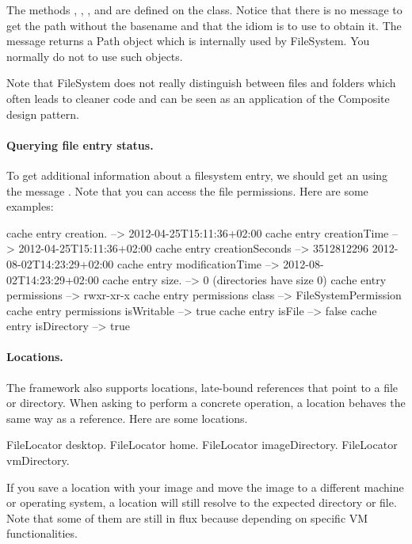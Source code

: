\documentclass[a4paper,10pt,twoside]{book}
\begin{document}
The methods , , , and   are defined on the  class. Notice that there is no message to get 
the path without the basename and that the idiom is to use  to obtain it.
The message  returns a Path object which is internally used by FileSystem. You normally do not to use such objects. 
  
Note that FileSystem does not really distinguish between files and folders which often leads to cleaner code and can be seen as an application of the Composite design pattern.   
  
\paragraph{Querying file entry status.}
To get additional information about a filesystem entry, we should get an  using the message . Note that you can access the file permissions. Here are some examples:

\begin{code}{}
cache entry creation.		-->  2012-04-25T15:11:36+02:00
cache entry creationTime -->  2012-04-25T15:11:36+02:00
cache entry creationSeconds -->  3512812296 2012-08-02T14:23:29+02:00
cache entry modificationTime -->  2012-08-02T14:23:29+02:00
cache entry size.			--> 0 (directories have size 0)
cache entry permissions		-->  rwxr-xr-x
cache entry permissions class		-->  FileSystemPermission
cache entry permissions isWritable --> true
cache entry isFile			--> false
cache entry isDirectory 		--> true
\end{code} 


\paragraph{Locations.}
The framework also supports locations, late-bound references that point to a file or directory. When asking to perform a concrete operation, a location behaves the same way as a reference. Here are some  locations.

\begin{code}{}
FileLocator desktop.
FileLocator home.
FileLocator imageDirectory.
FileLocator vmDirectory.
\end{code} 

If you save a location with your image and move the image to a different machine or operating system, a location will still resolve to the expected directory or file. Note that some of them are still in flux because depending on specific VM functionalities. 
\end{document}
